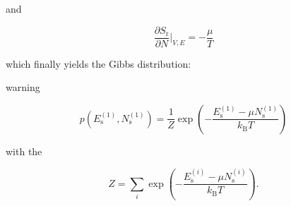 \documentclass[letterpaper,10pt,english]{sphinxmanual}
\begin{document}
\sphinxAtStartPar
and

\sphinxAtStartPar
\begin{equation}
\frac{\partial S_\mathrm{r}}{\partial N}\bigg|_{V,E}=-\frac{\mu}{T}
\end{equation}

\sphinxAtStartPar
which finally yields the Gibbs distribution:

\begin{sphinxadmonition}{warning}{}\unskip
\sphinxAtStartPar
{}

\sphinxAtStartPar
\begin{equation}
p(E_\mathrm{s}^{(1)},N_\mathrm{s}^{(1)})=\frac{1}{Z}\exp\left ( -\frac{E_\mathrm{s}^{(1)}-\mu N_\mathrm{s}^{(1)} }{k_\mathrm{B} T} \right )
\end{equation}

\sphinxAtStartPar
with the 

\sphinxAtStartPar
\begin{equation}
Z=\sum_{i}\exp \left ( -\frac{E_\mathrm{s}^{(i)}-\mu N_\mathrm{s}^{(i)}}{k_\mathrm{B} T}\right ).
\end{equation}
\end{sphinxadmonition}
\end{document}
